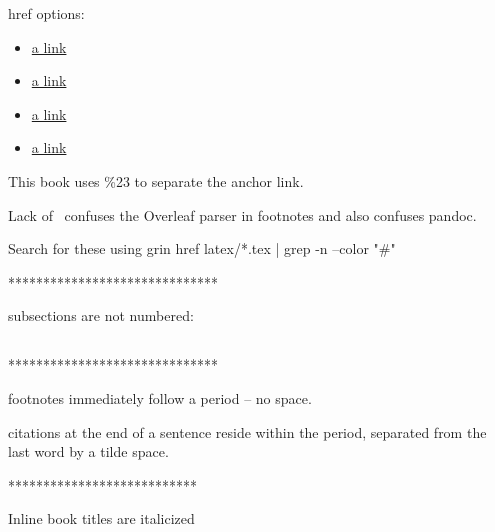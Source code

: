 
href options:
\begin{itemize}
    \item \href{https://en.wikipedia.org/wiki/Business_process%23Adam_Smith}{a link}
    \item \href{https://en.wikipedia.org/wiki/Business_process\%23Adam_Smith}{a link}
    \item \href{https://en.wikipedia.org/wiki/Business_process#Adam_Smith}{a link}
    \item \href{https://en.wikipedia.org/wiki/Business_process\#Adam_Smith}{a link}
\end{itemize}
This book uses \%23 to separate the anchor link. 

Lack of \ confuses the Overleaf parser in footnotes and also confuses pandoc.

Search for these using
grin href latex/*.tex | grep -n --color "#"

******************************

subsections are not numbered: \subsection*{}

******************************

footnotes immediately follow a period -- no space. 

citations at the end of a sentence reside within the period, separated from the last word by a tilde space.

***************************

Inline book titles are italicized